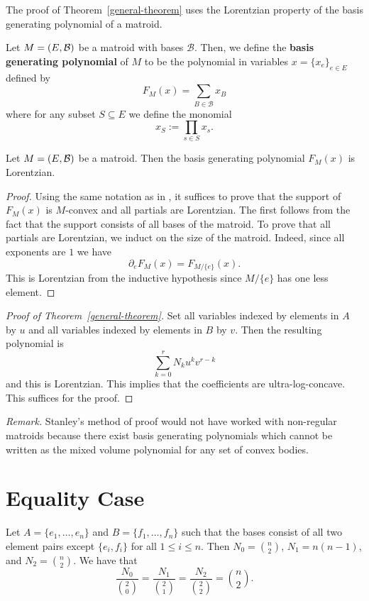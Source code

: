 \documentclass[12pt]{article}
\begin{document}
The proof of Theorem~\ref{general-theorem} uses the Lorentzian property of the basis generating polynomial of a matroid. 

\begin{defn}
	Let $M = (E, \mathcal{B})$ be a matroid with bases $\mathcal{B}$. Then, we define the \textbf{basis generating polynomial} of $M$ to be the polynomial in variables $x = \{x_e\}_{e \in E}$ defined by 
	\[
		F_M(x) = \sum_{B \in \mathcal{B}} x_B
	\]
	where for any subset $S \subseteq E$ we define the monomial
	\[
		x_S := \prod_{s \in S} x_s. 
	\]
\end{defn}

\begin{prop}
	Let $M = (E, \mathcal{B})$ be a matroid. Then the basis generating polynomial $F_M(x)$ is Lorentzian. 
\end{prop}

\begin{proof}
	Using the same notation as in \cite{lorentzian-polynomials}, it suffices to prove that the support of $F_M(x)$ is $M$-convex and all partials are Lorentzian. The first follows from the fact that the support consists of all bases of the matroid. To prove that all partials are Lorentzian, we induct on the size of the matroid. Indeed, since all exponents are $1$ we have 
	\[
		\partial_e F_M(x) = F_{M / \{e\}} (x).
	\]
	This is Lorentzian from the inductive hypothesis since $M / \{e\}$ has one less element. 
\end{proof}

\begin{proof}[Proof of Theorem~\ref{general-theorem}]
	Set all variables indexed by elements in $A$ by $u$ and all variables indexed by elements in $B$ by $v$. Then the resulting polynomial is 
	\[
		\sum_{k = 0}^r N_k u^k v^{r-k}
	\]
	and this is Lorentzian. This implies that the coefficients are ultra-log-concave. This suffices for the proof. 
\end{proof}

\textit{Remark.} Stanley's method of proof would not have worked with non-regular matroids because there exist basis generating polynomials which cannot be written as the mixed volume polynomial for any set of convex bodies.

\section{Equality Case}

\begin{example}
	Let $A = \{e_1, \ldots, e_n\}$ and $B = \{f_1, \ldots, f_n\}$ such that the bases consist of all two element pairs except $\{e_i, f_i\}$ for all $1 \leq i \leq n$. Then $N_0 = \binom{n}{2}$, $N_1 = n(n-1)$, and $N_2 = \binom{n}{2}$. We have that 
	\[
		\frac{N_0}{\binom{2}{0}} = \frac{N_1}{\binom{2}{1}} = \frac{N_2}{\binom{2}{2}} = \binom{n}{2}. 
	\]
\end{example}
\end{document}
